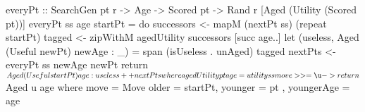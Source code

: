 everyPt :: SearchGen pt r -> Age -> Scored pt
         -> Rand r [Aged (Utility (Scored pt))]
everyPt ss age startPt = do
  successors <- mapM (nextPt ss) (repeat startPt)
  tagged <- zipWithM agedUtility successors [succ age..]
  let (useless, Aged (Useful newPt) newAge : _) =
                        span (isUseless . unAged) tagged
  nextPts <- everyPt ss newAge newPt
  return $ Aged (Useful startPt) age : useless ++ nextPts

  where agedUtility pt age =
           utility ss move >>= \u -> return $ Aged u age
         where move = Move { older = startPt, younger = pt
                           , youngerAge = age }
